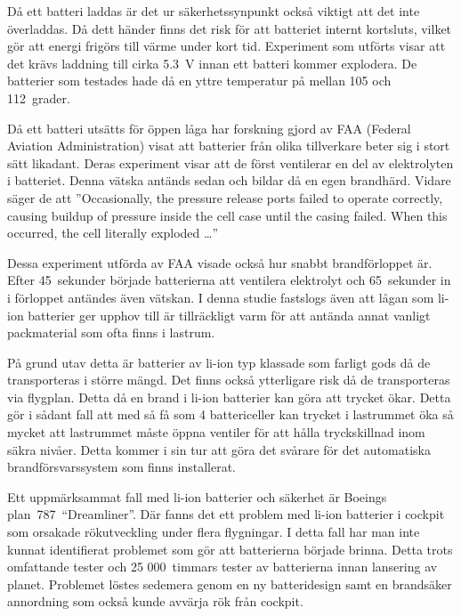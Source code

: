 \documentclass[a4paper,12pt]{article}
\begin{document}
Då ett batteri laddas är det ur säkerhetssynpunkt också viktigt att det inte överladdas. Då dett händer finns det risk för att batteriet internt kortsluts, vilket gör att energi frigörs till värme under kort tid. Experiment som utförts \cite{overcharging} visar att det krävs laddning till cirka 5.3~V innan ett batteri kommer explodera. De batterier som testades hade då en yttre temperatur på mellan 105 och 112~grader.

Då ett batteri utsätts för öppen låga har forskning gjord av FAA (Federal Aviation Administration) \cite{fire-faa} visat att batterier från olika tillverkare beter sig i stort sätt likadant. Deras experiment visar att de först ventilerar en del av elektrolyten i batteriet. Denna vätska antänds sedan och bildar då en egen brandhärd. Vidare säger de att ''Occasionally, the pressure release ports failed to operate correctly, causing buildup of pressure inside the cell case until the casing failed. When this occurred, the cell literally exploded …''

Dessa experiment utförda av FAA visade också hur snabbt brandförloppet är. Efter 45~sekunder började batterierna att ventilera elektrolyt och 65~sekunder in i förloppet antändes även vätskan. I denna studie fastslogs även att lågan som li-ion batterier ger upphov till är tillräckligt varm för att antända annat vanligt packmaterial som ofta finns i lastrum.\cite{fire-faa}

På grund utav detta är batterier av li-ion typ klassade som farligt gods då de transporteras i större mängd. Det finns också ytterligare risk då de transporteras via flygplan. Detta då en brand i li-ion batterier kan göra att trycket ökar. Detta gör i sådant fall att med så få som 4 battericeller kan trycket i lastrummet öka så mycket att lastrummet måste öppna ventiler för att hålla tryckskillnad inom säkra nivåer. Detta kommer i sin tur att göra det svårare för det automatiska brandförsvarssystem som finns installerat.\cite{fire-faa}

Ett uppmärksammat fall med li-ion batterier och säkerhet är Boeings plan~787~“Dreamliner”. Där fanns det ett problem med li-ion batterier i cockpit som orsakade rökutveckling under flera flygningar. I detta fall har man inte kunnat identifierat problemet som gör att batterierna började brinna. Detta trots omfattande tester och 25 000~timmars tester av batterierna innan lansering av planet. Problemet löstes sedemera genom en ny batteridesign samt en brandsäker annordning som också kunde avvärja rök från cockpit.\cite{dreamliner}
\end{document}
